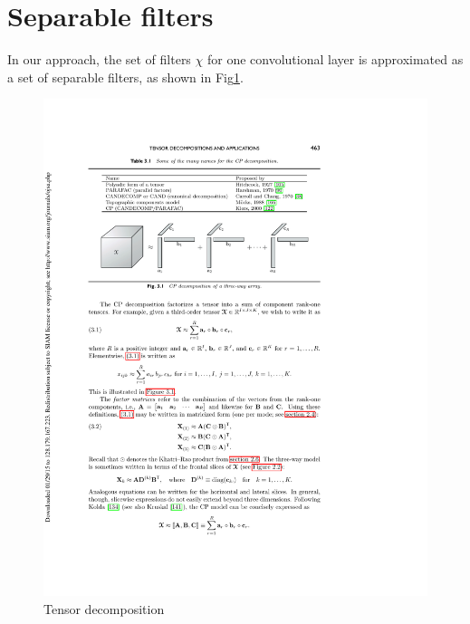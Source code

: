 \documentclass{article} %
\begin{document}
\section{Separable filters}
In our approach, the set of filters $\chi$ for one convolutional layer is approximated as
a set of separable filters, as shown in Fig\ref{fig:decomposition}.
\begin{figure}[h]
  \centering
   \includegraphics[width=\textwidth]{images/decomposable.pdf}
  \caption{Tensor decomposition}
  \label{fig:decomposition}
\end{figure}
\end{document}

